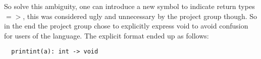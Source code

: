 
So solve this ambiguity, one can introduce a new symbol to indicate return types $=>$, this was considered ugly and unnecessary by the project group though. So in the end the project group chose to explicitly express void to avoid confusion for users of the language. The explicit format ended up as follows:
\begin{verbatim}
  printint(a): int -> void
\end{verbatim}
